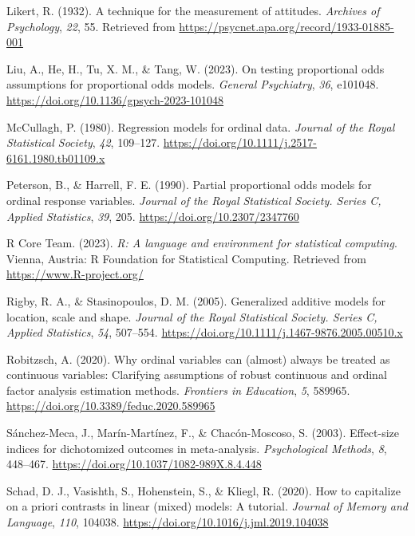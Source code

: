\documentclass[
  man, mask,floatsintext]{apa6}
\newlength{\cslhangindent}
\newenvironment{CSLReferences}[2] %
 {\begin{list}{}{%
  \setlength{\itemindent}{0pt}
  \setlength{\leftmargin}{0pt}
  \setlength{\parsep}{0pt}
  \ifodd #1
   \setlength{\leftmargin}{\cslhangindent}
   \setlength{\itemindent}{-1\cslhangindent}
  \fi
  \setlength{\itemsep}{#2\baselineskip}}}
 {\end{list}}
\begin{document}
\begin{CSLReferences}{1}{0}
Likert, R. (1932). A technique for the measurement of attitudes. \emph{Archives of Psychology}, \emph{22}, 55. Retrieved from \url{https://psycnet.apa.org/record/1933-01885-001}

Liu, A., He, H., Tu, X. M., \& Tang, W. (2023). On testing proportional odds assumptions for proportional odds models. \emph{General Psychiatry}, \emph{36}, e101048. \url{https://doi.org/10.1136/gpsych-2023-101048}

McCullagh, P. (1980). Regression models for ordinal data. \emph{Journal of the Royal Statistical Society}, \emph{42}, 109--127. \url{https://doi.org/10.1111/j.2517-6161.1980.tb01109.x}

Peterson, B., \& Harrell, F. E. (1990). Partial proportional odds models for ordinal response variables. \emph{Journal of the Royal Statistical Society. Series C, Applied Statistics}, \emph{39}, 205. \url{https://doi.org/10.2307/2347760}

R Core Team. (2023). \emph{R: A language and environment for statistical computing}. Vienna, Austria: R Foundation for Statistical Computing. Retrieved from \url{https://www.R-project.org/}

Rigby, R. A., \& Stasinopoulos, D. M. (2005). Generalized additive models for location, scale and shape. \emph{Journal of the Royal Statistical Society. Series C, Applied Statistics}, \emph{54}, 507--554. \url{https://doi.org/10.1111/j.1467-9876.2005.00510.x}

Robitzsch, A. (2020). Why ordinal variables can (almost) always be treated as continuous variables: Clarifying assumptions of robust continuous and ordinal factor analysis estimation methods. \emph{Frontiers in Education}, \emph{5}, 589965. \url{https://doi.org/10.3389/feduc.2020.589965}

Sánchez-Meca, J., Marín-Martínez, F., \& Chacón-Moscoso, S. (2003). Effect-size indices for dichotomized outcomes in meta-analysis. \emph{Psychological Methods}, \emph{8}, 448--467. \url{https://doi.org/10.1037/1082-989X.8.4.448}

Schad, D. J., Vasishth, S., Hohenstein, S., \& Kliegl, R. (2020). How to capitalize on a priori contrasts in linear (mixed) models: A tutorial. \emph{Journal of Memory and Language}, \emph{110}, 104038. \url{https://doi.org/10.1016/j.jml.2019.104038}


\end{CSLReferences}
\end{document}
